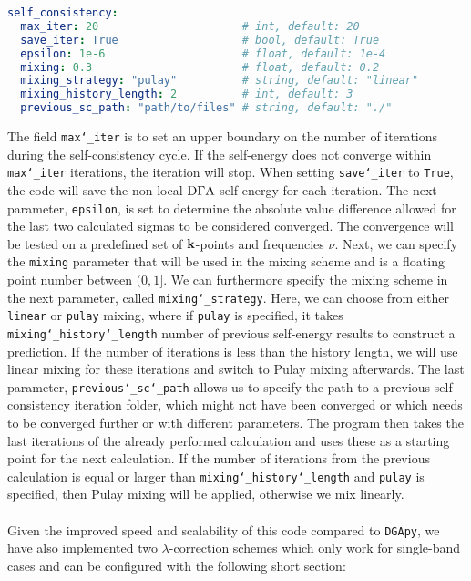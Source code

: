 \documentclass[../../main.tex]{subfiles}
\begin{document}
\begin{minipage}{\textwidth}%
\begin{lstlisting}[language=yaml]
self_consistency:
  max_iter: 20                      # int, default: 20
  save_iter: True                   # bool, default: True
  epsilon: 1e-6                     # float, default: 1e-4
  mixing: 0.3                       # float, default: 0.2
  mixing_strategy: "pulay"          # string, default: "linear"
  mixing_history_length: 2          # int, default: 3
  previous_sc_path: "path/to/files" # string, default: "./"
\end{lstlisting}
\end{minipage}
The field \texttt{max\char`_iter} is to set an upper boundary on the number of iterations during the self-consistency cycle. If the self-energy does not converge within \texttt{max\char`_iter} iterations, the iteration will stop. When setting \texttt{save\char`_iter} to \texttt{True}, the code will save the non-local $\text{D}\Gamma\text{A}$ self-energy for each iteration. The next parameter, \texttt{epsilon}, is set to determine the absolute value difference allowed for the last two calculated sigmas to be considered converged. The convergence will be tested on a predefined set of $\textbf{k}$-points and frequencies $\nu$. Next, we can specify the \texttt{mixing} parameter that will be used in the mixing scheme and is a floating point number between $(0,1]$. We can furthermore specify the mixing scheme in the next parameter, called \texttt{mixing\char`_strategy}. Here, we can choose from either \texttt{linear} or \texttt{pulay} mixing, where if \texttt{pulay} is specified, it takes \texttt{mixing\char`_history\char`_length} number of previous self-energy results to construct a prediction. If the number of iterations is less than the history length, we will use linear mixing for these iterations and switch to Pulay mixing afterwards. The last parameter, \texttt{previous\char`_sc\char`_path} allows us to specify the path to a previous self-consistency iteration folder, which might not have been converged or which needs to be converged further or with different parameters. The program then takes the last iterations of the already performed calculation and uses these as a starting point for the next calculation. If the number of iterations from the previous calculation is equal or larger than \texttt{mixing\char`_history\char`_length} and \texttt{pulay} is specified, then Pulay mixing will be applied, otherwise we mix linearly.
\\\\
Given the improved speed and scalability of this code compared to \texttt{DGApy}, we have also implemented two $\lambda$-correction schemes which only work for single-band cases and can be configured with the following short section:
\end{document}
